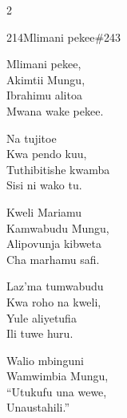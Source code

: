 \begin{multicols}{2}
\begin{hymn}{214}{Mlimani pekee}{\#243}
\begin{stanza}
Mlimani pekee,\\
Akimtii Mungu,\\
Ibrahimu alitoa\\
Mwana wake pekee.
\end{stanza}
\begin{chorus}
Na tujitoe\\
Kwa pendo kuu,\\
Tuthibitishe kwamba\\
Sisi ni wako tu.
\end{chorus}
\begin{stanza}
Kweli Mariamu\\
Kamwabudu Mungu,\\
Alipovunja kibweta\\
Cha marhamu safi.
\end{stanza}
\begin{stanza}
Laz'ma tumwabudu\\
Kwa roho na kweli,\\
Yule aliyetufia\\
Ili tuwe huru.
\end{stanza}
\begin{stanza}
Walio mbinguni\\
Wamwimbia Mungu,\\
``Utukufu una wewe,\\
Unaustahili.''
\end{stanza}
\end{hymn}


\end{multicols}
